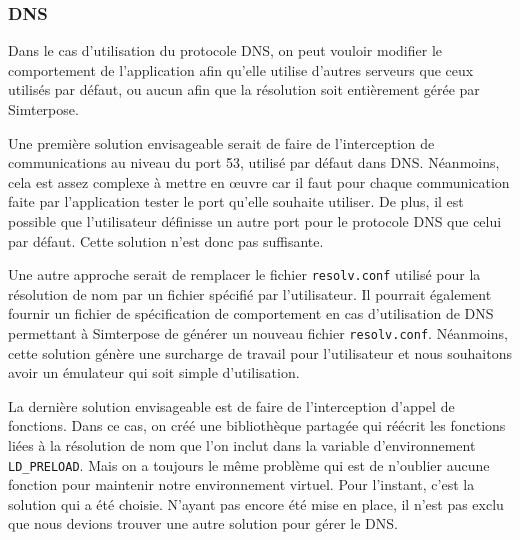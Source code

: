 \subsubsection{DNS}
 \label{section:DNS}

Dans le cas d'utilisation du protocole DNS, on peut vouloir modifier le
comportement de l'application afin qu'elle utilise d'autres serveurs que ceux
utilisés par défaut, ou aucun afin que la résolution soit entièrement gérée par
Simterpose. 

Une première solution envisageable serait de faire de l'interception de
communications au niveau du port 53, utilisé par défaut dans DNS. Néanmoins,
cela est assez complexe à mettre en \oe uvre car il faut pour chaque
communication faite par l'application tester le port qu'elle souhaite
utiliser. De plus, il est possible que l'utilisateur définisse un autre port
pour le protocole DNS que celui par défaut. Cette solution n'est donc pas
suffisante.

Une autre approche serait de remplacer le fichier \texttt{resolv.conf}
utilisé pour la résolution de nom par un fichier spécifié par
l'utilisateur. Il pourrait également fournir un fichier de
spécification de comportement en cas d'utilisation de DNS permettant
à Simterpose de générer un nouveau
fichier \texttt{resolv.conf}. Néanmoins, cette solution génère une
surcharge de travail pour l'utilisateur et nous souhaitons avoir un
émulateur qui soit simple d'utilisation.

La dernière solution envisageable est de faire de l'interception d'appel de
fonctions. Dans ce cas, on créé une bibliothèque partagée qui réécrit les fonctions
liées à la résolution de nom que l'on inclut dans la variable d'environnement
\texttt{LD\_PRELOAD}. Mais on a toujours le même problème qui est de n'oublier
aucune fonction pour maintenir notre environnement virtuel. Pour l'instant,
c'est la solution qui a été choisie. N'ayant pas encore été mise en place, il
n'est pas exclu que nous devions trouver une autre solution pour gérer le DNS.

\vspace{0.5cm}
